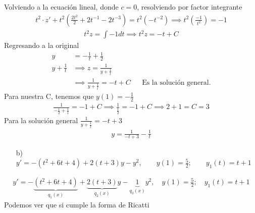 Volviendo a la ecuación lineal, donde $c=0$, resolviendo por factor integrante
\begin{align*}
    t^{2}\cdot z' + t^{2}\left( \frac{2t^{2}}{2} +2t^{-1} -2t^{-3} \right) = t^{2}(-t^{-2}) \implies t^{2}\left( \frac{-1}{t^{2}}\right) = -1
\end{align*}
\begin{align*}
    t^{2}z = \int -1dt \implies t^{2}z= -t + C
\end{align*}
Regresando a la original
\begin{align*}
    y  & = - \frac{1}{t}+ \frac{1}{2}\\
    y + \frac{1}{t} & \implies z = \frac{1}{y+\frac{1}{t}}\\
    & \implies \frac{1}{y+\frac{1}{t}} = -t+ C 
    & & \text{Es la solución general.}
\end{align*}
Para nuestra C, tenemos que $y(1)= -\frac{1}{2}$
\begin{align*}
    \frac{1}{-\frac{1}{2}+\frac{1}{1}}=-1+C \implies \frac{1}{\frac{1}{2}}= -1+C \implies 2+1 = C = 3
\end{align*}
Para la solución general $\displaystyle \frac{1}{y+\frac{1}{t}}=-t+3$
\begin{align*}
    y = \frac{1}{-t+3}- \frac{1}{t}
\end{align*}
\begin{enumerate}
    \item[b)] $y'= - (t^{2}+6t+4)+2(t+3)y-y^{2}, \qquad y(1)= \frac{5}{2}; \qquad y_{1}(t)=t+1$
\end{enumerate}
\begin{align*}
    y'= - \underbrace{(t^{2}+6t+4)}_{q_{1}(x)}+\underbrace{2(t+3)}_{q_{2}(x)}y-\underbrace{1}_{q_{3}(x)}y^{2}, \quad y(1)= \frac{5}{2}; \quad y_{1}(t)=t+1
\end{align*}
Podemos ver que si cumple la forma de Ricatti\\

